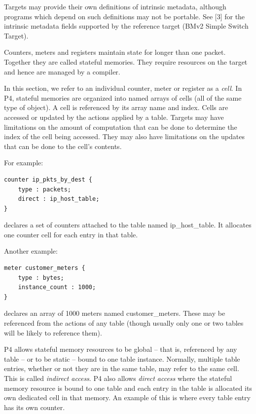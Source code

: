 \documentclass[12pt]{article}
\begin{document}
Targets may provide their own definitions of intrinsic metadata, although
programs which depend on such definitions may not be portable.
See [3] for the intrinsic metadata fields supported by the reference target (BMv2 Simple Switch Target).


Counters, meters and registers maintain state for longer than one packet.
Together they are called stateful memories. They require resources on the
target and hence are managed by a compiler.

In this section, we refer to an individual counter, meter or register as a
\textit{cell}. In P4, stateful memories are organized into named arrays of cells
(all of the same type of object). A cell is referenced by its array name and
index. Cells are accessed or updated by the actions applied by a table. Targets
may have limitations on the amount of computation that can be done to determine
the index of the cell being accessed.  They may also have limitations on
the updates that can be done to the cell's contents.

For example:

\begin{lstlisting}[keywords={},frame=single,escapechar=\@]
counter ip_pkts_by_dest {
    type : packets;
    direct : ip_host_table;
}
\end{lstlisting}


declares a set of counters attached to the table named ip_host_table. It
allocates one counter cell for each entry in that table.

Another example:

\begin{lstlisting}[keywords={},frame=single,escapechar=\@]
meter customer_meters {
    type : bytes;
    instance_count : 1000;
}
\end{lstlisting}


declares an array of 1000 meters named customer_meters. These may be referenced
from the actions of any table (though usually only one or two tables will
be likely to reference them).

P4 allows stateful memory resources to be global -- that is, referenced by
any table -- or to be static -- bound to one table instance. Normally, multiple
table entries, whether or not they are in the same table, may refer to the
same cell. This is called \textit{indirect access}. P4 also allows \textit{direct access} where
the stateful memory resource is bound to one table and each entry in the table
is allocated its own dedicated cell in that memory. An example of this is
where every table entry has its own counter.
\end{document}
